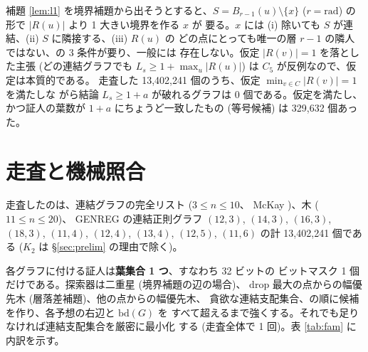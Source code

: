 \documentclass[paper=a4,fontsize=10.5pt,jafontsize=10.5pt]{jlreq}
\theoremstyle{plain}
\theoremstyle{definition}
\begin{document}
補題 \ref{lem:l1} を境界補題から出そうとすると、$S = B_{r-1}(u) \setminus
\{x\}$ ($r = \mathrm{rad}$) の形で $|R(u)|$ より 1 大きい境界を作る $x$ が
要る。$x$ には (i) 除いても $S$ が連結、(ii) $S$ に隣接する、(iii) $R(u)$ の
どの点にとっても唯一の層 $r-1$ の隣人ではない、の 3 条件が要り、一般には
存在しない。仮定 $|R(v)| = 1$ を落とした主張 (どの連結グラフでも
$L_s \ge 1 + \max_u |R(u)|$) は $C_5$ が反例なので、仮定は本質的である。
走査した 13,402,241 個のうち、仮定 $\min_{v \in C}|R(v)| = 1$ を満たしな
がら結論 $L_s \ge 1 + a$ が破れるグラフは 0 個である。仮定を満たし、
かつ証人の葉数が $1 + a$ にちょうど一致したもの (等号候補) は 329,632
個あった。

\section{走査と機械照合}\label{sec:machine}

走査したのは、連結グラフの完全リスト ($ 3 \le n \le 10$、
McKay \cite{mckay})、木 ($11 \le n \le 20$)、
GENREG \cite{genreg} の連結正則グラフ $(12, 3)$, $(14, 3)$, $(16, 3)$, $(18, 3)$, $(11, 4)$, $(12, 4)$, $(13, 4)$, $(12, 5)$, $(11, 6)$
の計 13,402,241 個である ($K_2$ は \S\ref{sec:prelim} の理由で除く)。

各グラフに付ける証人は\textbf{葉集合 1 つ}、すなわち 32 ビットの
ビットマスク 1 個だけである。探索器は二重星 (境界補題の辺の場合)、
$\mathrm{drop}$ 最大の点からの幅優先木 (層落差補題)、他の点からの幅優先木、
貪欲な連結支配集合、の順に候補を作り、各予想の右辺と $\mathrm{bd}(G)$ を
すべて超えるまで強くする。それでも足りなければ連結支配集合を厳密に最小化
する (走査全体で 1 回)。表 \ref{tab:fam} に内訳を示す。
\end{document}
